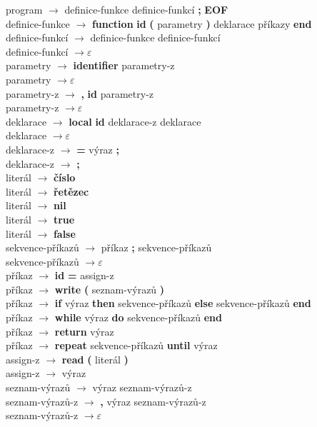 program $ \rightarrow $ definice-funkce   definice-funkcí   \textbf{;}   \textbf{EOF} \\
definice-funkce $ \rightarrow $	\textbf{function} \textbf{id} \textbf{(} parametry \textbf{)} deklarace příkazy \textbf{end} \\
definice-funkcí $ \rightarrow $ definice-funkce   definice-funkcí \\
definice-funkcí $ \rightarrow \varepsilon $ \\
parametry $ \rightarrow $	\textbf{identifier}   parametry-z \\
parametry $ \rightarrow \varepsilon $ \\
parametry-z $ \rightarrow $ \textbf{,}   \textbf{id} parametry-z \\
parametry-z $ \rightarrow 	\varepsilon $ \\
deklarace $ \rightarrow $	\textbf{local} \textbf{id} deklarace-z   deklarace \\
deklarace $ \rightarrow \varepsilon $ \\
deklarace-z $ \rightarrow $ \textbf{=} výraz \textbf{;} \\
deklarace-z $ \rightarrow $ \textbf{;} \\
literál $ \rightarrow $	\textbf{číslo} \\
literál $ \rightarrow $ \textbf{řetězec} \\
literál $ \rightarrow $ \textbf{nil} \\
literál $ \rightarrow $ \textbf{true} \\
literál $ \rightarrow $ \textbf{false} \\ 
sekvence-příkazů $ \rightarrow $	příkaz   \textbf{;}   sekvence-příkazů \\
sekvence-příkazů $ \rightarrow \varepsilon $ \\
příkaz $ \rightarrow $	\textbf{id} \textbf{=} assign-z \\
příkaz $ \rightarrow $	\textbf{write} \textbf{(} seznam-výrazů \textbf{)} \\
příkaz $ \rightarrow $	\textbf{if} výraz \textbf{then} sekvence-příkazů \textbf{else} sekvence-příkazů \textbf{end} \\
příkaz $ \rightarrow $	\textbf{while} výraz \textbf{do} sekvence-příkazů \textbf{end} \\
příkaz $ \rightarrow $	\textbf{return} výraz \\
příkaz $ \rightarrow $	\textbf{repeat} sekvence-příkazů \textbf{until} výraz \\
assign-z $ \rightarrow $ \textbf{read}   \textbf{(}  literál \textbf{)} \\
assign-z $ \rightarrow $ výraz \\
seznam-výrazů $ \rightarrow $ výraz seznam-výrazů-z \\
seznam-výrazů-z $ \rightarrow $ \textbf{,} výraz seznam-výrazů-z \\
seznam-výrazů-z $ \rightarrow \varepsilon $ \\
